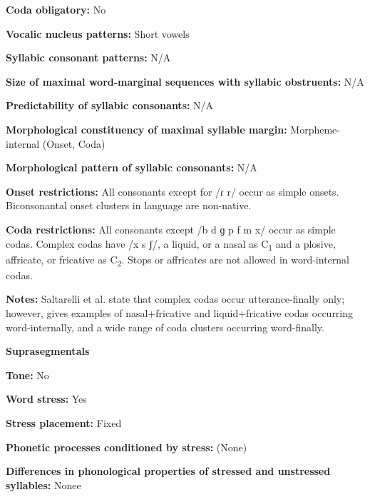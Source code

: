 \textbf{Coda obligatory:} No



\textbf{Vocalic nucleus patterns:} Short vowels



\textbf{Syllabic consonant patterns:} N/A



\textbf{Size of maximal word{}-marginal sequences with syllabic obstruents:} N/A



\textbf{Predictability of syllabic consonants:} N/A



\textbf{Morphological constituency of maximal syllable margin:} Morpheme-internal (Onset, Coda)



\textbf{Morphological pattern of syllabic consonants:} N/A



\textbf{Onset restrictions:} All consonants except for /ɾ r/ occur as simple onsets. Biconsonantal onset clusters in language are non-native.



\textbf{Coda restrictions:} All consonants except /b d ɡ p f m x/ occur as simple codas. Complex codas have /x s ʃ/, a liquid, or a nasal as C\textsubscript{1} and a plosive, affricate, or fricative as C\textsubscript{2}. Stops or affricates are not allowed in word-internal codas.



\textbf{Notes:} Saltarelli et al. state that complex codas occur utterance-finally only; however, \citet{Hualde2003} gives examples of nasal+fricative and liquid+fricative codas occurring word-internally, and a wide range of coda clusters occurring word-finally.



\textbf{Suprasegmentals}



\textbf{Tone:} No



\textbf{Word stress:} Yes



\textbf{Stress placement:} Fixed



\textbf{Phonetic processes conditioned by stress:} (None)



\textbf{Differences in phonological properties of stressed and unstressed syllables:} Nonee



